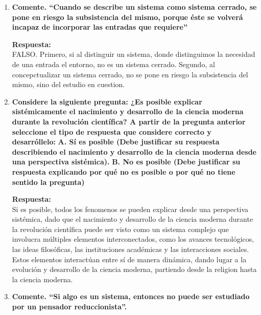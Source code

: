\documentclass[12pt,a4paper]{article}
\begin{document}
\begin{enumerate}[label=\textbf{Pregunta \arabic*.}]
          \textbf{Respuesta:} \\
          NO. Un subsistema no puede estar completamente aislado del resto de los subsistemas de un sistema,
          ya que todos los subsistemas interactúan y dependen entre sí para el funcionamiento del sistema
          en su conjunto.

    \item \textbf{Comente. “Cuando se describe un sistema como sistema
              cerrado, se pone en riesgo la subsistencia del mismo,
              porque éste se volverá incapaz de incorporar las entradas
              que requiere”}

          \textbf{Respuesta:} \\
          FALSO. Primero, si al distinguir un sistema, donde distinguimos la necesidad de una entrada el entorno, no es un sistema cerrado.
          Segundo, al concepctualizar un sistema cerrado, no se pone en riesgo la subsistencia del mismo, sino del estudio en cuestion.


    \item \textbf{Considere la siguiente pregunta: ¿Es posible explicar
              sistémicamente el nacimiento y desarrollo de la ciencia
              moderna durante la revolución científica?
              A partir de la pregunta anterior seleccione el tipo de
              respuesta que considere correcto y desarróllelo:}
          \subitem \textbf{A. Sí es posible (Debe justificar su respuesta
              describiendo el nacimiento y desarrollo de la ciencia
              moderna desde una perspectiva sistémica).}
          \subitem \textbf{B. No es posible (Debe justificar su respuesta explicando
              por qué no es posible o por qué no tiene sentido la
              pregunta)}

          \textbf{Respuesta:} \\
          Si es posible, todos los fenomenos se pueden explicar desde una perspectiva sistémica, dado que el nacimiento y desarrollo de la ciencia moderna durante la revolución científica puede ser visto como un sistema complejo que involucra múltiples elementos interconectados, como los avances tecnológicos, las ideas filosóficas, las instituciones académicas y las interacciones sociales. Estos elementos interactúan entre sí de manera dinámica, dando lugar a la evolución y desarrollo de la ciencia moderna,
          partiendo desde la religion hasta la ciencia moderna.

    \item \textbf{Comente. “Si algo es un sistema, entonces no puede
              ser estudiado por un pensador reduccionista”.}


\end{enumerate}
\end{document}
